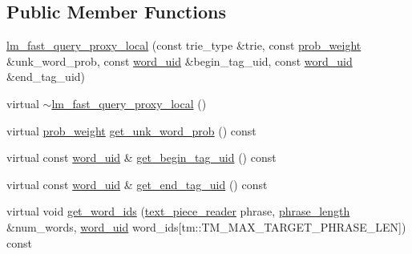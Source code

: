 \subsection*{Public Member Functions}
\begin{DoxyCompactItemize}
\item 
\hyperlink{classuva_1_1smt_1_1bpbd_1_1server_1_1lm_1_1proxy_1_1lm__fast__query__proxy__local_a9fb1bfa3326d7084829eaf05d9138976}{lm\+\_\+fast\+\_\+query\+\_\+proxy\+\_\+local} (const trie\+\_\+type \&trie, const \hyperlink{namespaceuva_1_1smt_1_1bpbd_1_1server_a01e9ea4de9c226f4464862e84ff0bbcc}{prob\+\_\+weight} \&unk\+\_\+word\+\_\+prob, const \hyperlink{namespaceuva_1_1smt_1_1bpbd_1_1server_a6bfe45ba344d65a7fdd7d26156328ddc}{word\+\_\+uid} \&begin\+\_\+tag\+\_\+uid, const \hyperlink{namespaceuva_1_1smt_1_1bpbd_1_1server_a6bfe45ba344d65a7fdd7d26156328ddc}{word\+\_\+uid} \&end\+\_\+tag\+\_\+uid)
\item 
virtual \hyperlink{classuva_1_1smt_1_1bpbd_1_1server_1_1lm_1_1proxy_1_1lm__fast__query__proxy__local_a61cabd0355db1922b81c0ad13f2ae4b0}{$\sim$lm\+\_\+fast\+\_\+query\+\_\+proxy\+\_\+local} ()
\item 
virtual \hyperlink{namespaceuva_1_1smt_1_1bpbd_1_1server_a01e9ea4de9c226f4464862e84ff0bbcc}{prob\+\_\+weight} \hyperlink{classuva_1_1smt_1_1bpbd_1_1server_1_1lm_1_1proxy_1_1lm__fast__query__proxy__local_a8ea28c0c78a2e6e13d90e83191c399bb}{get\+\_\+unk\+\_\+word\+\_\+prob} () const 
\item 
virtual const \hyperlink{namespaceuva_1_1smt_1_1bpbd_1_1server_a6bfe45ba344d65a7fdd7d26156328ddc}{word\+\_\+uid} \& \hyperlink{classuva_1_1smt_1_1bpbd_1_1server_1_1lm_1_1proxy_1_1lm__fast__query__proxy__local_a5210236c6ea75466dc52df82f595630b}{get\+\_\+begin\+\_\+tag\+\_\+uid} () const 
\item 
virtual const \hyperlink{namespaceuva_1_1smt_1_1bpbd_1_1server_a6bfe45ba344d65a7fdd7d26156328ddc}{word\+\_\+uid} \& \hyperlink{classuva_1_1smt_1_1bpbd_1_1server_1_1lm_1_1proxy_1_1lm__fast__query__proxy__local_a324b9d32f9ffb5c1a134a66e06e14002}{get\+\_\+end\+\_\+tag\+\_\+uid} () const 
\item 
virtual void \hyperlink{classuva_1_1smt_1_1bpbd_1_1server_1_1lm_1_1proxy_1_1lm__fast__query__proxy__local_af2a1db87b5e25ac64dec4f60d511efb0}{get\+\_\+word\+\_\+ids} (\hyperlink{classuva_1_1utils_1_1file_1_1text__piece__reader}{text\+\_\+piece\+\_\+reader} phrase, \hyperlink{namespaceuva_1_1smt_1_1bpbd_1_1server_af068a19c2e03116caf3e3827a3e40e35}{phrase\+\_\+length} \&num\+\_\+words, \hyperlink{namespaceuva_1_1smt_1_1bpbd_1_1server_a6bfe45ba344d65a7fdd7d26156328ddc}{word\+\_\+uid} word\+\_\+ids\mbox{[}tm\+::\+T\+M\+\_\+\+M\+A\+X\+\_\+\+T\+A\+R\+G\+E\+T\+\_\+\+P\+H\+R\+A\+S\+E\+\_\+\+L\+E\+N\mbox{]}) const 

\end{DoxyCompactItemize}

